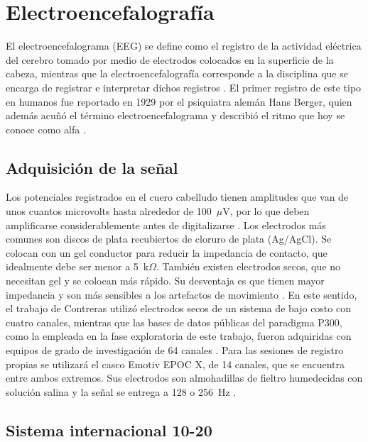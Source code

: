 \section[ELECTROENCEFALOGRAFÍA]{Electroencefalografía}
\label{sec:eeg}

El electroencefalograma (EEG) se define como el registro de la actividad eléctrica del cerebro
tomado por medio de electrodos colocados en la superficie de la cabeza, mientras que la
electroencefalografía corresponde a la disciplina que se encarga de registrar e interpretar dichos
registros \cite{kane2017}. El primer registro de este tipo en humanos fue reportado en 1929 por el
psiquiatra alemán Hans Berger, quien además acuñó el término electroencefalograma y describió el
ritmo que hoy se conoce como alfa \cite{berger1929}.

\subsection{Adquisición de la señal}

Los potenciales registrados en el cuero cabelludo tienen amplitudes que van de unos cuantos
microvolts hasta alrededor de 100~$\mu$V, por lo que deben amplificarse considerablemente antes
de digitalizarse \cite{sanei2007}. Los electrodos más comunes son discos de plata recubiertos de
cloruro de plata (Ag/AgCl). Se colocan con un gel conductor para reducir la impedancia de contacto,
que idealmente debe ser menor a 5~k$\Omega$. También existen electrodos secos, que no necesitan gel
y se colocan más rápido. Su desventaja es que tienen mayor impedancia y son más sensibles a los
artefactos de movimiento \cite{niedermeyer2005}. En este sentido, el trabajo de Contreras \cite{contreras2021} utilizó
electrodos secos de un sistema de bajo costo con cuatro canales, mientras que las bases de datos
públicas del paradigma P300, como la empleada en la fase exploratoria de este trabajo, fueron
adquiridas con equipos de grado de investigación de 64 canales \cite{blankertz2006}. Para las
sesiones de registro propias se utilizará el casco Emotiv EPOC X, de 14 canales, que se encuentra
entre ambos extremos. Sus electrodos son almohadillas de fieltro humedecidas con solución salina y
la señal se entrega a 128 o 256~Hz \cite{emotivepocx}.

\subsection{Sistema internacional 10-20}

